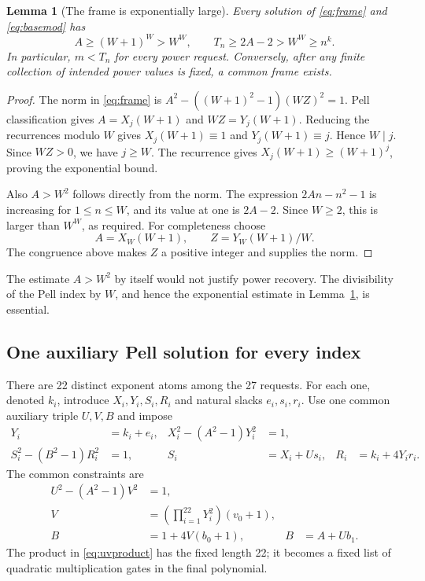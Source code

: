 \documentclass[11pt,letterpaper]{article}
\newtheorem{lemma}[theorem]{Lemma}
\theoremstyle{definition}\newtheorem{definition}[theorem]{Definition}
\theoremstyle{remark}\newtheorem{remark}[theorem]{Remark}
\begin{document}
\begin{lemma}[The frame is exponentially large]\label{lem:frame}
Every solution of \eqref{eq:frame} and \eqref{eq:basemod} has
\[
 A\ge(W+1)^W>W^W,
 \qquad T_n\ge2A-2>W^W\ge n^k.
\]
In particular, $m<T_n$ for every power request. Conversely, after any
finite collection of intended power values is fixed, a common frame exists.
\end{lemma}
\begin{proof}
The norm in \eqref{eq:frame} is
$A^2-((W+1)^2-1)(WZ)^2=1$. Pell classification gives
$A=X_j(W+1)$ and $WZ=Y_j(W+1)$. Reducing the recurrences modulo $W$
gives $X_j(W+1)\equiv1$ and $Y_j(W+1)\equiv j$. Hence $W\mid j$.
Since $WZ>0$, we have $j\ge W$. The recurrence gives
$X_j(W+1)\ge(W+1)^j$, proving the exponential bound.

Also $A>W^2$ follows directly from the norm. The expression
$2An-n^2-1$ is increasing for $1\le n\le W$, and its value at one is
$2A-2$. Since $W\ge2$, this is larger than $W^W$, as required.
For completeness choose
\[
 A=X_W(W+1),\qquad Z=Y_W(W+1)/W.
\]
The congruence above makes $Z$ a positive integer and supplies the norm.
\end{proof}

The estimate $A>W^2$ by itself would not justify power recovery. The
divisibility of the Pell index by $W$, and hence the exponential estimate
in Lemma~\ref{lem:frame}, is essential.

\subsection{One auxiliary Pell solution for every index}

There are 22 distinct exponent atoms among the 27 requests. For each
one, denoted $k_i$, introduce $X_i,Y_i,S_i,R_i$ and natural slacks
$e_i,s_i,r_i$. Use one common auxiliary triple $U,V,B$ and impose
\begin{align}
 Y_i&=k_i+e_i,&X_i^2-(A^2-1)Y_i^2&=1,\label{eq:index1}\\
 S_i^2-(B^2-1)R_i^2&=1,&
 S_i&=X_i+Us_i,&R_i&=k_i+4Y_ir_i.\label{eq:index2}
\end{align}
The common constraints are
\begin{align}
 U^2-(A^2-1)V^2&=1,\label{eq:uvnorm}\\
 V&=\left(\prod_{i=1}^{22}Y_i^2\right)(v_0+1),\label{eq:uvproduct}\\
 B&=1+4V(b_0+1),&B&=A+Ub_1.\label{eq:bcommon}
\end{align}
The product in \eqref{eq:uvproduct} has the fixed length 22; it becomes
a fixed list of quadratic multiplication gates in the final polynomial.
\end{document}
